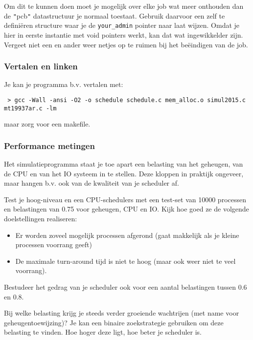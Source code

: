 \documentclass[11pt,a4paper,twoside]{article}
\begin{document}
Om dit te kunnen doen moet je mogelijk over elke job wat meer onthouden dan de
\texttt{{}"{}}pcb\texttt{{}"{}} datastructuur je normaal toestaat. Gebruik daarvoor een zelf te
defini\"eren structure waar je de \texttt{your\_admin} pointer naar laat wijzen. Omdat je hier in eerste instantie 
met void pointers werkt, kan dat wat ingewikkelder zijn.
Vergeet niet een en ander weer netjes op te ruimen bij het be\"eindigen
van de job.

\subsubsection*{Vertalen en linken}

Je kan je programma b.v. vertalen met: 
\begin{verbatim} > gcc -Wall -ansi -O2 -o schedule schedule.c mem_alloc.o simul2015.c mt19937ar.c -lm
\end{verbatim}
maar zorg voor een makefile.


\subsubsection*{Performance metingen}

Het simulatieprogramma staat je toe apart een belasting van het
geheugen, van de CPU en van het IO systeem in te stellen. Deze kloppen
in praktijk ongeveer, maar hangen b.v. ook van de kwaliteit van je
scheduler af.


Test je hoog-niveau en een CPU-schedulers met een
test-set van 10000 processen en belastingen van 0.75 voor geheugen, CPU
en IO. Kijk hoe goed ze de volgende doelstellingen realiseren:
\begin{itemize}  \item Er worden zoveel mogelijk processen afgerond (gaat makkelijk als
je kleine processen voorrang geeft)
    \item De maximale turn-around tijd is niet te hoog (maar ook weer niet
te veel voorrang).
\end{itemize}

Bestudeer het gedrag van je scheduler
ook voor een aantal belastingen tussen 0.6 en 0.8.

 Bij welke belasting krijg je steeds verder groeiende wachtrijen (met
 name voor geheugentoewijzing)? Je kan een binaire zoekstrategie
 gebruiken om deze
 belasting te vinden. Hoe hoger deze ligt,
 hoe beter je scheduler is.
 
\end{document}
